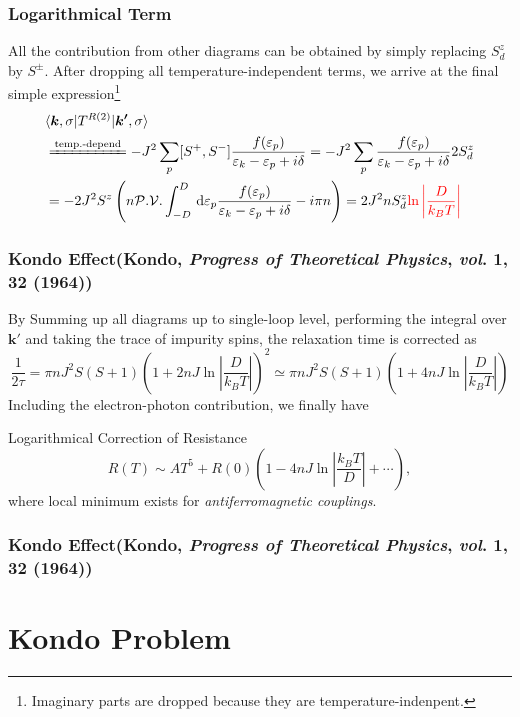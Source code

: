 \documentclass[10pt,aspectratio=43,xcolor=x11names,t]{beamer}%
\begin{document}
		\begin{frame}\frametitle{Logarithmical Term}
			All the contribution from other diagrams can be obtained by simply replacing $S_d^z$ by $S^\pm$. After dropping all temperature-independent terms, we arrive at the final simple expression\footnote{Imaginary parts are dropped because they are temperature-indenpent.}
			\begin{align*}
				&\langle\bm{k},\sigma|T^{R(2)}|\bm{k'},\sigma\rangle\\
				&\xlongequal{\text{temp.-depend}}-J^2\sum_p[S^+,S^-]\dfrac{f(\varepsilon_p)}{\varepsilon_k- \varepsilon_p+i\delta}=-J^2\sum_p\dfrac{f(\varepsilon_p)}{\varepsilon_k- \varepsilon_p+i\delta}2S_d^z\nonumber\\
				&=-2J^2S^z\left(n\mathcal{P.V.}\int_{-D}^D\,\dd \varepsilon_p\dfrac{f(\varepsilon_p)}{\varepsilon_k- \varepsilon_p+i\delta}-i\pi n\right)=2J^2nS_d^z{\color{red}\ln\left|\dfrac{D}{k_BT}\right|}
			\end{align*}
		\end{frame}
		\begin{frame}\frametitle{Kondo Effect({\footnotesize Kondo, \textit{Progress of Theoretical Physics}, \textit{vol}. \textbf{1}, 32 (1964)})}
			By Summing up all diagrams up to single-loop level, performing the integral over $\bm{k'}$ and taking the trace of impurity spins, the relaxation time is corrected as
			\begin{equation*}
				\dfrac{1}{2\tau}=\pi n J^2S(S+1)\left(1+2nJ\ln\left|\dfrac{D}{k_BT}\right|\right)^2\simeq\pi n J^2S(S+1)\left(1+4nJ\ln\left|\dfrac{D}{k_BT}\right|\right)
			\end{equation*}
			Including the electron-photon contribution, we finally have
			\begin{block}{Logarithmical Correction of Resistance}
				\begin{equation*}
					R(T)\sim AT^5+R(0)\left(1-4n J\ln\left|\dfrac{k_BT}{D}\right|+\cdots\right),
				\end{equation*}
				where local minimum exists for \emph{antiferromagnetic couplings}.
			\end{block}
		\end{frame}
		\begin{frame}\frametitle{Kondo Effect({\footnotesize Kondo, \textit{Progress of Theoretical Physics}, \textit{vol}. \textbf{1}, 32 (1964)})}

		\end{frame}
		
\section{Kondo Problem}
\end{document}
